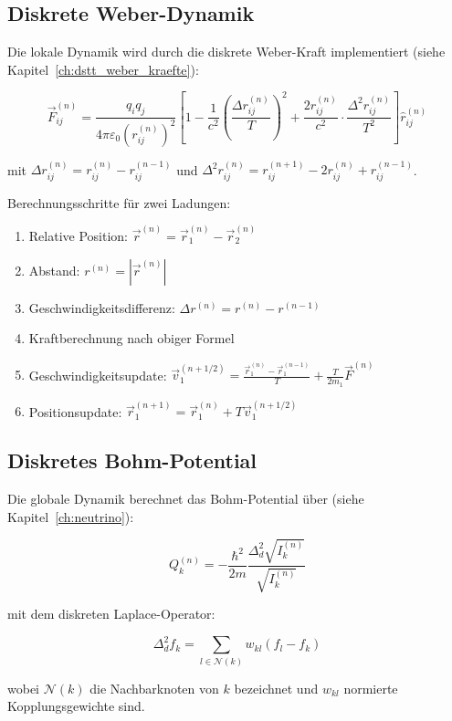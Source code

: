 \subsection{Diskrete Weber-Dynamik}
\label{sub:numerik_weber}

Die lokale Dynamik wird durch die diskrete Weber-Kraft implementiert (siehe Kapitel~\ref{ch:dstt_weber_kraefte}):

\[
\vec{F}_{ij}^{(n)} = \frac{q_i q_j}{4\pi \varepsilon_0 (r_{ij}^{(n)})^2} \left[ 1 - \frac{1}{c^2} \left( \frac{\Delta r_{ij}^{(n)}}{T} \right)^2 + \frac{2r_{ij}^{(n)}}{c^2} \cdot \frac{\Delta^2 r_{ij}^{(n)}}{T^2} \right] \hat{r}_{ij}^{(n)}
\]

mit \( \Delta r_{ij}^{(n)} = r_{ij}^{(n)} - r_{ij}^{(n-1)} \) und \( \Delta^2 r_{ij}^{(n)} = r_{ij}^{(n+1)} - 2r_{ij}^{(n)} + r_{ij}^{(n-1)} \).

Berechnungsschritte für zwei Ladungen:

\begin{enumerate}
    \item Relative Position: \( \vec{r}^{(n)} = \vec{r}_1^{(n)} - \vec{r}_2^{(n)} \)
    \item Abstand: \( r^{(n)} = |\vec{r}^{(n)}| \)
    \item Geschwindigkeitsdifferenz: \( \Delta r^{(n)} = r^{(n)} - r^{(n-1)} \)
    \item Kraftberechnung nach obiger Formel
    \item Geschwindigkeitsupdate: \( \vec{v}_1^{(n+1/2)} = \frac{\vec{r}_1^{(n)} - \vec{r}_1^{(n-1)}}{T} + \frac{T}{2m_1} \vec{F}^{(n)} \)
    \item Positionsupdate: \( \vec{r}_1^{(n+1)} = \vec{r}_1^{(n)} + T \vec{v}_1^{(n+1/2)} \)
\end{enumerate}

\subsection{Diskretes Bohm-Potential}
\label{sub:numerik_bohm}

Die globale Dynamik berechnet das Bohm-Potential über (siehe Kapitel~\ref{ch:neutrino}):

\[
Q_k^{(n)} = -\frac{\hbar^2}{2m} \frac{\Delta_d^2 \sqrt{I_k^{(n)}}}{\sqrt{I_k^{(n)}}}
\]

mit dem diskreten Laplace-Operator:

\[
\Delta_d^2 f_k = \sum_{l \in \mathcal{N}(k)} w_{kl} (f_l - f_k)
\]

wobei \( \mathcal{N}(k) \) die Nachbarknoten von \( k \) bezeichnet und \( w_{kl} \) normierte Kopplungsgewichte sind.

